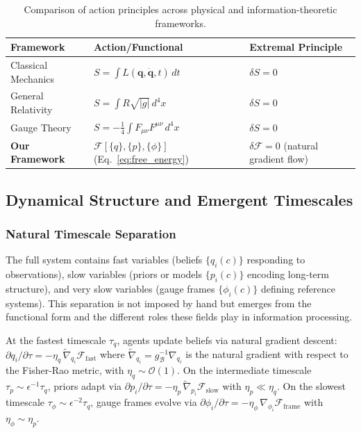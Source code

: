 \documentclass[11pt]{article}
\begin{document}
\begin{table}[h]
\centering
\begin{tabular}{|l|l|l|}
\hline
\textbf{Framework} & \textbf{Action/Functional} & \textbf{Extremal Principle} \\
\hline
Classical Mechanics & $S = \int L(\mathbf{q}, \dot{\mathbf{q}}, t) \, dt$ & $\delta S = 0$ \\
General Relativity & $S = \int R \sqrt{|g|} \, d^4x$ & $\delta S = 0$ \\
Gauge Theory & $S = -\frac{1}{4}\int F_{\mu\nu}F^{\mu\nu} \, d^4x$ & $\delta S = 0$ \\
\textbf{Our Framework} & $\mathcal{F}[\{q\}, \{p\}, \{\phi\}]$ (Eq.~\ref{eq:free_energy}) & $\delta \mathcal{F} = 0$ (natural gradient flow) \\
\hline
\end{tabular}
\caption{Comparison of action principles across physical and information-theoretic frameworks.}
\label{tab:action_principles}
\end{table}

\subsection{Dynamical Structure and Emergent Timescales}

\subsubsection{Natural Timescale Separation}

The full system contains fast variables (beliefs $\{q_i(c)\}$ responding to observations), slow variables (priors or models $\{p_i(c)\}$ encoding long-term structure), and very slow variables (gauge frames $\{\phi_i(c)\}$ defining reference systems). This separation is not imposed by hand but emerges from the functional form and the different roles these fields play in information processing.

At the fastest timescale $\tau_q$, agents update beliefs via natural gradient descent: $\partial q_i/\partial \tau = -\eta_q \, \tilde{\nabla}_{q_i} \mathcal{F}_{\text{fast}}$ where $\tilde{\nabla}_{q_i} = g_{\mathcal{B}}^{-1} \nabla_{q_i}$ is the natural gradient with respect to the Fisher-Rao metric, with $\eta_q \sim \mathcal{O}(1)$. On the intermediate timescale $\tau_p \sim \epsilon^{-1} \tau_q$, priors adapt via $\partial p_i/\partial \tau = -\eta_p \, \tilde{\nabla}_{p_i} \mathcal{F}_{\text{slow}}$ with $\eta_p \ll \eta_q$. On the slowest timescale $\tau_\phi \sim \epsilon^{-2} \tau_q$, gauge frames evolve via $\partial \phi_i/\partial \tau = -\eta_\phi \, \nabla_{\phi_i} \mathcal{F}_{\text{frame}}$ with $\eta_\phi \sim \eta_p$.
\end{document}

